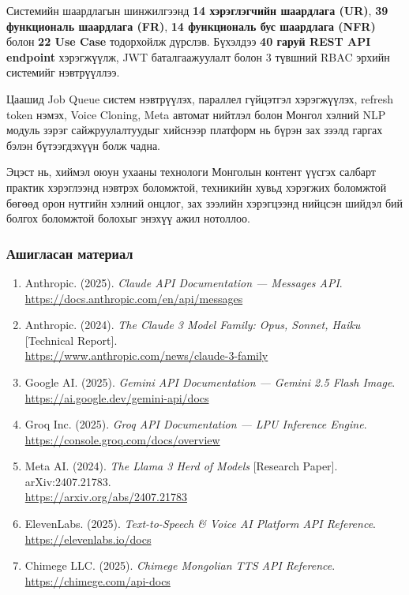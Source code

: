 Системийн шаардлагын шинжилгээнд \textbf{14 хэрэглэгчийн шаардлага (UR)}, \textbf{39 функциональ шаардлага (FR)}, \textbf{14 функциональ бус шаардлага (NFR)} болон \textbf{22 Use Case} тодорхойлж дүрслэв. Бүхэлдээ \textbf{40 гаруй REST API endpoint} хэрэгжүүлж, JWT баталгаажуулалт болон 3 түвшний RBAC эрхийн системийг нэвтрүүллээ.

Цаашид Job Queue систем нэвтрүүлэх, параллел гүйцэтгэл хэрэгжүүлэх, refresh token нэмэх, Voice Cloning, Meta автомат нийтлэл болон Монгол хэлний NLP модуль зэрэг сайжруулалтуудыг хийснээр платформ нь бүрэн зах зээлд гаргах бэлэн бүтээгдэхүүн болж чадна.

Эцэст нь, хиймэл оюун ухааны технологи Монголын контент үүсгэх салбарт практик хэрэглээнд нэвтрэх боломжтой, техникийн хувьд хэрэгжих боломжтой бөгөөд орон нутгийн хэлний онцлог, зах зээлийн хэрэгцээнд нийцсэн шийдэл бий болгох боломжтой болохыг энэхүү ажил нотоллоо.

\clearpage



\subsubsection*{Ашигласан материал}

\begin{enumerate}
  \item Anthropic. (2025). \textit{Claude API Documentation --- Messages API}. \\
        \url{https://docs.anthropic.com/en/api/messages}
  \item Anthropic. (2024). \textit{The Claude 3 Model Family: Opus, Sonnet, Haiku} [Technical Report]. \\
        \url{https://www.anthropic.com/news/claude-3-family}
  \item Google AI. (2025). \textit{Gemini API Documentation --- Gemini 2.5 Flash Image}. \\
        \url{https://ai.google.dev/gemini-api/docs}
  \item Groq Inc. (2025). \textit{Groq API Documentation --- LPU Inference Engine}. \\
        \url{https://console.groq.com/docs/overview}
  \item Meta AI. (2024). \textit{The Llama 3 Herd of Models} [Research Paper]. arXiv:2407.21783. \\
        \url{https://arxiv.org/abs/2407.21783}
  \item ElevenLabs. (2025). \textit{Text-to-Speech \& Voice AI Platform API Reference}. \\
        \url{https://elevenlabs.io/docs}
  \item Chimege LLC. (2025). \textit{Chimege Mongolian TTS API Reference}. \\
        \url{https://chimege.com/api-docs}
\end{enumerate}

